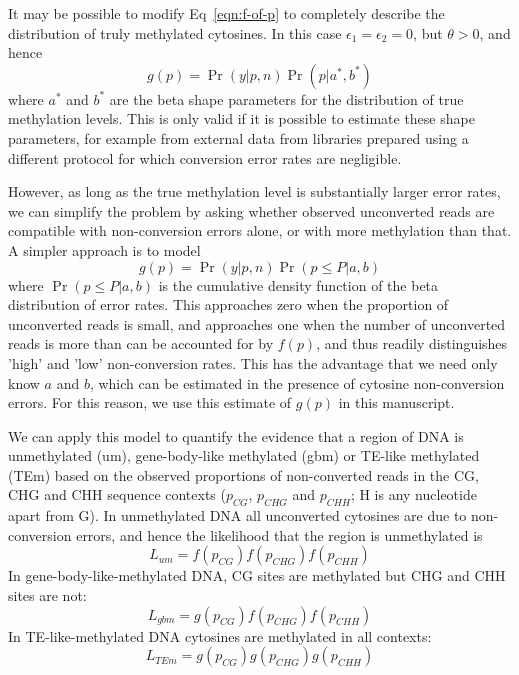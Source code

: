 \documentclass[10pt,letterpaper,draft]{article}
\begin{document}
It may be possible to modify Eq~\ref{eqn:f-of-p} to completely describe the distribution of truly methylated cytosines.
In this case $\epsilon_1=\epsilon_2=0$, but $\theta>0$, and hence
\begin{equation}
    g(p) = \Pr(y | p, n) \Pr(p | a^*,b^*)
\end{equation}
where $a^*$ and $b^*$ are the beta shape parameters for the distribution of true methylation levels.
This is only valid if it is possible to estimate these shape parameters, for example from external data from libraries prepared using a different protocol for which conversion error rates are negligible.

However, as long as the true methylation level is substantially larger error rates, we can simplify the problem by asking whether observed unconverted reads are compatible with non-conversion errors alone, or with more methylation than that.
A simpler approach is to model 
\begin{equation}
    g(p) = \Pr(y | p, n) \Pr(p \leq P | a,b)
\end{equation}
where $\Pr(p \leq P | a,b)$ is the cumulative density function of the beta distribution of error rates.
This approaches zero when the proportion of unconverted reads is small, and approaches one when the number of unconverted reads is more than can be accounted for by $f(p)$, and thus readily distinguishes 'high' and 'low' non-conversion rates.
This has the advantage that we need only know $a$ and $b$, which can be estimated in the presence of cytosine non-conversion errors.
For this reason, we use this estimate of $g(p)$ in this manuscript.

We can apply this model to quantify the evidence that a region of DNA is unmethylated (um), gene-body-like methylated (gbm) or TE-like methylated (TEm) based on the observed proportions of non-converted reads in the CG, CHG and CHH sequence contexts ($p_{CG}$, $p_{CHG}$ and $p_{CHH}$; H is any nucleotide apart from G).
In unmethylated DNA all unconverted cytosines are due to non-conversion errors, and hence the likelihood that the region is unmethylated is
\begin{equation}
    L_{um} = f(p_{CG}) f(p_{CHG}) f(p_{CHH})
\end{equation}
In gene-body-like-methylated DNA, CG sites are methylated but CHG and CHH sites are not: 
\begin{equation}
    L_{gbm} = g(p_{CG}) f(p_{CHG}) f(p_{CHH})
\end{equation}
In TE-like-methylated DNA cytosines are methylated in all contexts:
\begin{equation}
    L_{TEm} = g(p_{CG}) g(p_{CHG}) g(p_{CHH})
\end{equation}
\end{document}
